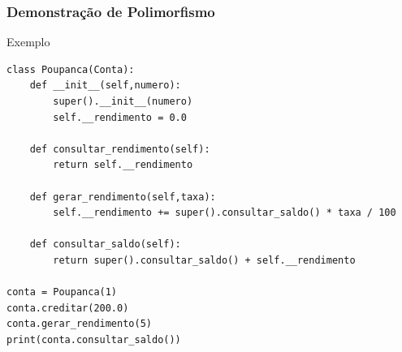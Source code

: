 \documentclass{beamer}
\begin{document}
\begin{frame}[fragile]
	\frametitle{Demonstração de Polimorfismo}
		
	\begin{exampleblock}{Exemplo}
	   \begin{lstlisting}
class Poupanca(Conta):
    def __init__(self,numero):
        super().__init__(numero)
        self.__rendimento = 0.0
    
    def consultar_rendimento(self):
        return self.__rendimento

    def gerar_rendimento(self,taxa):
        self.__rendimento += super().consultar_saldo() * taxa / 100

    def consultar_saldo(self):
        return super().consultar_saldo() + self.__rendimento

conta = Poupanca(1)
conta.creditar(200.0)
conta.gerar_rendimento(5)
print(conta.consultar_saldo())
       \end{lstlisting}
	\end{exampleblock}
\end{frame}
\end{document}

